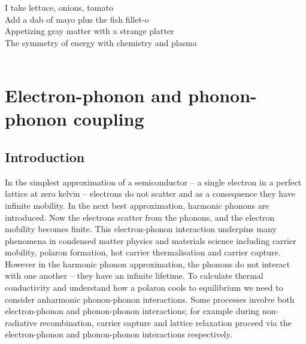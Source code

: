 \begin{savequote}[8cm]
I take lettuce, onions, tomato \\
Add a dab of mayo plus the fish fillet-o \\
Appetizing gray matter with a strange platter \\
The symmetry of energy with chemistry and plasma \\
  \\
\end{savequote}


\chapter{\label{ch:5-epcoupling}Electron-phonon and phonon-phonon coupling}
\section{Introduction} \label{ch5:introduction}

In the simplest approximation of a semiconductor -- a single electron in a perfect lattice at zero kelvin -- electrons do not scatter and as a consequence they have infinite mobility. In the next best approximation, harmonic phonons are introduced. Now the electrons scatter from the phonons, and the electron mobility becomes finite. This electron-phonon interaction underpins many phenomena in condensed matter physics and materials science including carrier mobility, polaron formation, hot carrier thermalisation and carrier capture. However in the harmonic phonon approximation, the phonons do not interact with one another -- they have an infinite lifetime. To calculate thermal conductivity and understand how a polaron cools to equilibrium we need to consider anharmonic phonon-phonon interactions. Some processes involve both electron-phonon and phonon-phonon interactions; for example during non-radiative recombination, carrier capture and lattice relaxation proceed via the electron-phonon and phonon-phonon interactions respectively. 

